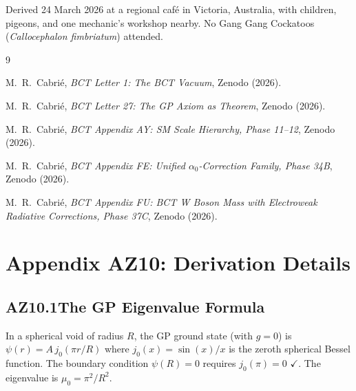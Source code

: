 \documentclass[aps,prl,twocolumn,showpacs,preprintnumbers]{revtex4-2}
\begin{document}
\begin{acknowledgments}
Derived 24 March 2026 at a regional caf\'e in Victoria, Australia,
with children, pigeons, and one mechanic's workshop nearby.
No Gang Gang Cockatoos (\textit{Callocephalon fimbriatum}) attended.
\end{acknowledgments}

\begin{thebibliography}{9}

M.~R.~Cabri\'e, \textit{BCT Letter 1: The BCT Vacuum}, Zenodo (2026).

M.~R.~Cabri\'e, \textit{BCT Letter 27: The GP Axiom as Theorem},
Zenodo (2026).

M.~R.~Cabri\'e, \textit{BCT Appendix AY: SM Scale Hierarchy,
Phase 11--12}, Zenodo (2026).

M.~R.~Cabri\'e, \textit{BCT Appendix FE: Unified $\alpha_0$-Correction
Family, Phase 34B}, Zenodo (2026).

M.~R.~Cabri\'e, \textit{BCT Appendix FU: BCT W Boson Mass with
Electroweak Radiative Corrections, Phase 37C}, Zenodo (2026).

\end{thebibliography}

\clearpage
\appendix

\section*{Appendix AZ10: Derivation Details}
\setcounter{equation}{0}
\renewcommand{\theequation}{AZ10.\arabic{equation}}

\subsection*{AZ10.1\quad The GP Eigenvalue Formula}

In a spherical void of radius $R$, the GP ground state (with $g=0$)
is $\psi(r) = A\,j_0(\pi r/R)$ where $j_0(x) = \sin(x)/x$ is the
zeroth spherical Bessel function. The boundary condition $\psi(R)=0$
requires $j_0(\pi) = 0$ $\checkmark$. The eigenvalue is $\mu_0 = \pi^2/R^2$.
\end{document}
